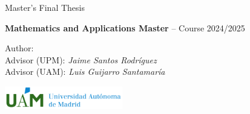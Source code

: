 \documentclass[aspectratio=169]{beamer}
\begin{document}
\begin{frame}[plain]

\begin{center}

  \bigskip  \bigskip

  \begin{Large} \textcolor{green}{\textbf{\projecttitle}} \end{Large} \bigskip \bigskip

  \begin{footnotesize} \textrm{Master's Final Thesis} \\ \end{footnotesize} \bigskip \bigskip

  \begin{footnotesize} \textbf{Mathematics and Applications Master} -- Course 2024/2025 \end{footnotesize} \bigskip \bigskip

  \begin{footnotesize} \textsf{Author:} \textit{\authorname} \\
  \smallskip \textsf{Advisor (UPM):} \textit{Jaime Santos Rodríguez} \\
  \smallskip \textsf{Advisor (UAM):} \textit{Luis Guijarro Santamaría} \\
\end{footnotesize} \bigskip \bigskip


  \includegraphics[height=1cm]{../figures/marcaUAM_AhorizontalColor_imp.pdf}

\end{center}

\end{frame}
\end{document}
